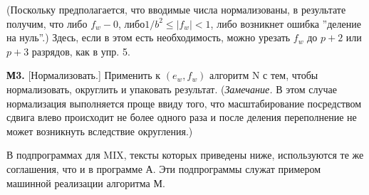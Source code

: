 {(Поскольку предполагается, что вводимые числа нормализованы, в результате получим, что либо $f_w - 0$, $либо 1/b^2 \leq |f_w| < 1$, либо возникнет ошибка ''деление на нуль''.) Здесь, если в этом есть необходимость, можно урезать $f_w$ до $p + 2$ или $p + 3$ разрядов, как в упр. 5.

\textbf{М3.} [Нормализовать.] Применить к $(e_w,f_w)$ алгоритм N с тем, чтобы нормализовать, округлить и упаковать результат. (\textit{Замечание.} В этом случае нормализация выполняется проще ввиду того, что масштабирование посредством сдвига влево происходит не более одного раза и после деления переполнение не может возникнуть вследствие округления.)

В подпрограммах для MIX, тексты которых приведены ниже, используются те же соглашения, что и в программе А. Эти подпрограммы служат примером машинной реализации алгоритма М.

}

